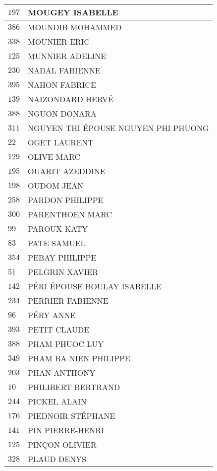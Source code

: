 \begin{xltabular}{\linewidth}{|l|X|}
    $197$ & MOUGEY ISABELLE \\
    \hline
    $386$ & MOUNDIB MOHAMMED \\
    \hline
    $338$ & MOUNIER ERIC \\
    \hline
    $125$ & MUNNIER ADELINE \\
    \hline
    $230$ & NADAL FABIENNE \\
    \hline
    $395$ & NAHON FABRICE \\
    \hline
    $139$ & NAIZONDARD HERVÉ \\
    \hline
    $388$ & NGUON DONARA \\
    \hline
    $311$ & NGUYEN THI ÉPOUSE NGUYEN PHI PHUONG \\
    \hline
    $22$ & OGET LAURENT \\
    \hline
    $129$ & OLIVE MARC \\
    \hline
    $195$ & OUARIT AZEDDINE \\
    \hline
    $198$ & OUDOM JEAN \\
    \hline
    $258$ & PARDON PHILIPPE \\
    \hline
    $300$ & PARENTHOEN MARC \\
    \hline
    $99$ & PAROUX KATY \\
    \hline
    $83$ & PATE SAMUEL \\
    \hline
    $354$ & PEBAY PHILIPPE \\
    \hline
    $51$ & PELGRIN XAVIER \\
    \hline
    $142$ & PÉRI ÉPOUSE BOULAY ISABELLE \\
    \hline
    $234$ & PERRIER FABIENNE \\
    \hline
    $96$ & PÉRY ANNE \\
    \hline
    $393$ & PETIT CLAUDE \\
    \hline
    $388$ & PHAM PHUOC LUY \\
    \hline
    $349$ & PHAM BA NIEN PHILIPPE \\
    \hline
    $203$ & PHAN ANTHONY \\
    \hline
    $10$ & PHILIBERT BERTRAND \\
    \hline
    $244$ & PICKEL ALAIN \\
    \hline
    $176$ & PIEDNOIR STÉPHANE \\
    \hline
    $141$ & PIN PIERRE-HENRI \\
    \hline
    $125$ & PINÇON OLIVIER \\
    \hline
    $328$ & PLAUD DENYS \\

\end{xltabular}
